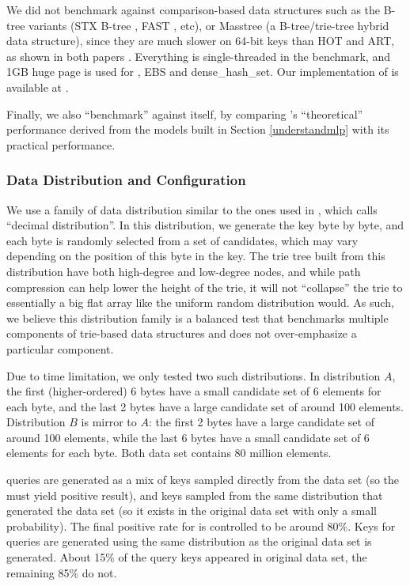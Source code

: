\documentclass[11pt, usletter]{article}
\begin{document}
We did not benchmark against comparison-based data structures such as the B-tree variants 
(STX B-tree \cite{stx_btree}, FAST \cite{fast_sigmod10}, etc), 
or Masstree \cite{masstree} (a B-tree/trie-tree hybrid data structure),
since they are much slower on 64-bit keys than HOT and ART, as shown in both papers \cite{hot_sigmod18, arttrie_icde13}.
Everything is single-threaded in the benchmark, and 1GB huge page is used for \MlpIndex, EBS and dense\_hash\_set. 
Our implementation of \MlpIndex is available at \cite{mlpds_repo}.

Finally, we also ``benchmark'' \MlpIndex against itself, 
by comparing \MlpIndex's ``theoretical'' performance derived from the models built in Section \ref{understandmlp} 
with its practical performance. 

\subsubsection*{Data Distribution and Configuration}

We use a family of data distribution similar to the ones used in \cite{masstree}, which \cite{masstree} calls ``decimal distribution''. 
In this distribution, we generate the key byte by byte, and each byte is randomly selected from a set of candidates, 
which may vary depending on the position of this byte in the key.
The trie tree built from this distribution have both high-degree and low-degree nodes, 
and while path compression can help lower the height of the trie, it will not ``collapse'' the trie 
to essentially a big flat array like the uniform random distribution would. 
As such, we believe this distribution family is a balanced test that 
benchmarks multiple components of trie-based data structures and does not over-emphasize a particular component. 

Due to time limitation, we only tested two such distributions. 
In distribution $A$, the first (higher-ordered) 6 bytes have a small candidate set of 6 elements for each byte, 
and the last 2 bytes have a large candidate set of around 100 elements. 
Distribution $B$ is mirror to $A$: the first 2 bytes have a large candidate set of around 100 elements,
while the last 6 bytes have a small candidate set of 6 elements for each byte.
Both data set contains 80 million elements.

\lookup queries are generated as a mix of keys sampled directly from the data set (so the \lookup must yield positive result),
and keys sampled from the same distribution that generated the data set (so it exists in the original data set 
with only a small probability). The final positive rate for \lookup is controlled to be around 80\%. 
Keys for \lowerbound queries are generated using the same distribution as the original data set is generated. 
About 15\% of the \lowerbound query keys appeared in original data set, the remaining 85\% do not. 
\end{document}

